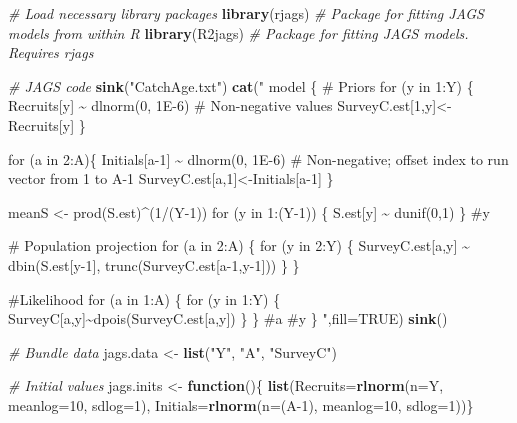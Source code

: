 \documentclass[
]{krantz}
\makeatletter
\newenvironment{Shaded}{\begin{snugshade}}{\end{snugshade}}
\newcommand{\AttributeTok}[1]{\textcolor[rgb]{0.27,0.27,0.27}{#1}}
\newcommand{\CommentTok}[1]{\textcolor[rgb]{0.37,0.37,0.37}{\textit{#1}}}
\newcommand{\ConstantTok}[1]{\textcolor[rgb]{0.37,0.37,0.37}{#1}}
\newcommand{\ControlFlowTok}[1]{\textcolor[rgb]{0.27,0.27,0.27}{\textbf{#1}}}
\newcommand{\DecValTok}[1]{\textcolor[rgb]{0.06,0.06,0.06}{#1}}
\newcommand{\FunctionTok}[1]{\textcolor[rgb]{0.27,0.27,0.27}{\textbf{#1}}}
\newcommand{\NormalTok}[1]{#1}
\newcommand{\OtherTok}[1]{\textcolor[rgb]{0.37,0.37,0.37}{#1}}
\newcommand{\StringTok}[1]{\textcolor[rgb]{0.5,0.5,0.5}{#1}}
\newenvironment{kframe}{%
\medskip{}
\setlength{\fboxsep}{.8em}
 \def\at@end@of@kframe{}%
 \ifinner\ifhmode%
  \def\at@end@of@kframe{\end{minipage}}%
  \begin{minipage}{\columnwidth}%
 \fi\fi%
 \def\FrameCommand##1{\hskip\@totalleftmargin \hskip-\fboxsep
 \colorbox{shadecolor}{##1}\hskip-\fboxsep
     \hskip-\linewidth \hskip-\@totalleftmargin \hskip\columnwidth}%
 \MakeFramed {\advance\hsize-\width
   \@totalleftmargin\z@ \linewidth\hsize
   \@setminipage}}%
 {\par\unskip\endMakeFramed%
 \at@end@of@kframe}
\renewenvironment{Shaded}{\begin{kframe}}{\end{kframe}}
\makeatother
\begin{document}
\begin{Shaded}
\begin{Highlighting}[]
\CommentTok{\# Load necessary library packages}
\FunctionTok{library}\NormalTok{(rjags)   }\CommentTok{\# Package for fitting JAGS models from within R}
\FunctionTok{library}\NormalTok{(R2jags)  }\CommentTok{\# Package for fitting JAGS models. Requires rjags}

\CommentTok{\# JAGS code}
\FunctionTok{sink}\NormalTok{(}\StringTok{"CatchAge.txt"}\NormalTok{)}
\FunctionTok{cat}\NormalTok{(}\StringTok{"}
\StringTok{model \{}
\StringTok{    \# Priors}
\StringTok{    for (y in 1:Y) \{}
\StringTok{      Recruits[y] \textasciitilde{} dlnorm(0, 1E{-}6) \# Non{-}negative values}
\StringTok{    SurveyC.est[1,y]\textless{}{-}Recruits[y] \}}

\StringTok{    for (a in 2:A)\{}
\StringTok{      Initials[a{-}1] \textasciitilde{} dlnorm(0, 1E{-}6) }
\StringTok{      \# Non{-}negative; offset index to run vector from 1 to A{-}1}
\StringTok{    SurveyC.est[a,1]\textless{}{-}Initials[a{-}1] \}}

\StringTok{  meanS \textless{}{-} prod(S.est)\^{}(1/(Y{-}1))}
\StringTok{  for (y in 1:(Y{-}1)) \{}
\StringTok{    S.est[y] \textasciitilde{} dunif(0,1)}
\StringTok{    \} \#y}

\StringTok{    \# Population projection}
\StringTok{    for (a in 2:A) \{}
\StringTok{   for (y in 2:Y) \{}
\StringTok{     SurveyC.est[a,y] \textasciitilde{} dbin(S.est[y{-}1], trunc(SurveyC.est[a{-}1,y{-}1])) \} \}}

\StringTok{    \#Likelihood}
\StringTok{    for (a in 1:A) \{}
\StringTok{   for (y in 1:Y) \{}
\StringTok{      SurveyC[a,y]\textasciitilde{}dpois(SurveyC.est[a,y])}
\StringTok{     \} \} \#a \#y}
\StringTok{\}}
\StringTok{    "}\NormalTok{,}\AttributeTok{fill=}\ConstantTok{TRUE}\NormalTok{)}
\FunctionTok{sink}\NormalTok{()}

\CommentTok{\# Bundle data}
\NormalTok{jags.data }\OtherTok{\textless{}{-}} \FunctionTok{list}\NormalTok{(}\StringTok{"Y"}\NormalTok{, }\StringTok{"A"}\NormalTok{, }\StringTok{"SurveyC"}\NormalTok{)}

\CommentTok{\# Initial values}
\NormalTok{jags.inits }\OtherTok{\textless{}{-}} \ControlFlowTok{function}\NormalTok{()\{ }\FunctionTok{list}\NormalTok{(}\AttributeTok{Recruits=}\FunctionTok{rlnorm}\NormalTok{(}\AttributeTok{n=}\NormalTok{Y, }\AttributeTok{meanlog=}\DecValTok{10}\NormalTok{, }\AttributeTok{sdlog=}\DecValTok{1}\NormalTok{),}
                               \AttributeTok{Initials=}\FunctionTok{rlnorm}\NormalTok{(}\AttributeTok{n=}\NormalTok{(A}\DecValTok{{-}1}\NormalTok{), }\AttributeTok{meanlog=}\DecValTok{10}\NormalTok{, }\AttributeTok{sdlog=}\DecValTok{1}\NormalTok{))\}}


\end{Highlighting}
\end{Shaded}
\end{document}
